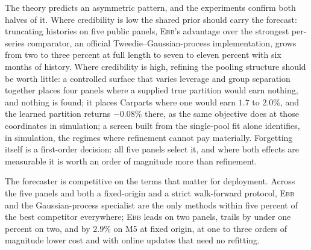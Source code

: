 \documentclass[twoside]{article}
\theoremstyle{definition}
\newcommand{\EBB}{\textsc{Ebb}}
\begin{document}
The theory predicts an asymmetric pattern, and the experiments confirm
both halves of it. Where credibility is low the shared prior should
carry the forecast: truncating histories on five public panels, \EBB{}'s
advantage over the strongest per-series comparator, an official
Tweedie--Gaussian-process implementation, grows from two to three percent
at full length to seven to eleven percent with six months of history.
Where credibility is high, refining the pooling structure should be
worth little: a controlled surface that varies leverage and group
separation together places four panels where a supplied true partition
would earn nothing, and nothing is found; it places Carparts where one
would earn $1.7$ to $2.0\%$, and the learned partition returns $-0.08\%$
there, as the same objective does at those coordinates in simulation; a
screen built from the single-pool fit alone identifies, in simulation,
the regimes where refinement cannot pay materially. Forgetting itself is
a first-order decision: all five panels select it,
and where both effects are measurable it is worth an order of magnitude
more than refinement.

The forecaster is competitive on the terms that matter for deployment.
Across the five panels and both a fixed-origin and a strict walk-forward
protocol, \EBB{} and the Gaussian-process specialist are the only methods
within five percent of the best competitor everywhere; \EBB{} leads on
two panels, trails by under one percent on two, and by $2.9\%$ on M5 at
fixed origin, at one to three orders of magnitude lower cost and with
online updates that need no refitting.
\end{document}
